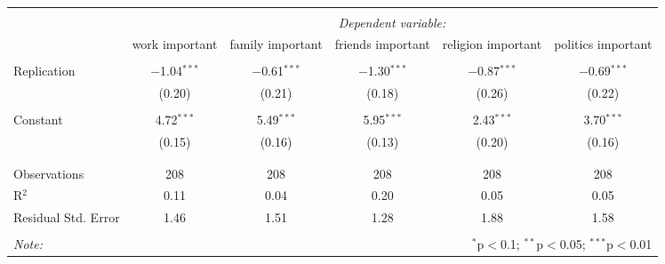 \documentclass[11pt,]{article}
\begin{document}
\begin{table}[!htbp] \centering 
  \caption{} 
  \label{} 
\begin{tabular}{@{\extracolsep{5pt}}lccccc} 
\\[-1.8ex]\hline 
\hline \\[-1.8ex] 
 & \multicolumn{5}{c}{\textit{Dependent variable:}} \\ 
\cline{2-6} 
 & work important & family important & friends important & religion important & politics important \\ 
\hline \\[-1.8ex] 
 Replication & $-$1.04$^{***}$ & $-$0.61$^{***}$ & $-$1.30$^{***}$ & $-$0.87$^{***}$ & $-$0.69$^{***}$ \\ 
  & (0.20) & (0.21) & (0.18) & (0.26) & (0.22) \\ 
  & & & & & \\ 
 Constant & 4.72$^{***}$ & 5.49$^{***}$ & 5.95$^{***}$ & 2.43$^{***}$ & 3.70$^{***}$ \\ 
  & (0.15) & (0.16) & (0.13) & (0.20) & (0.16) \\ 
  & & & & & \\ 
\hline \\[-1.8ex] 
Observations & 208 & 208 & 208 & 208 & 208 \\ 
R$^{2}$ & 0.11 & 0.04 & 0.20 & 0.05 & 0.05 \\ 
Residual Std. Error & 1.46 & 1.51 & 1.28 & 1.88 & 1.58 \\ 
\hline 
\hline \\[-1.8ex] 
\textit{Note:}  & \multicolumn{5}{r}{$^{*}$p$<$0.1; $^{**}$p$<$0.05; $^{***}$p$<$0.01} \\ 
\end{tabular} 
\end{table}
\end{document}
